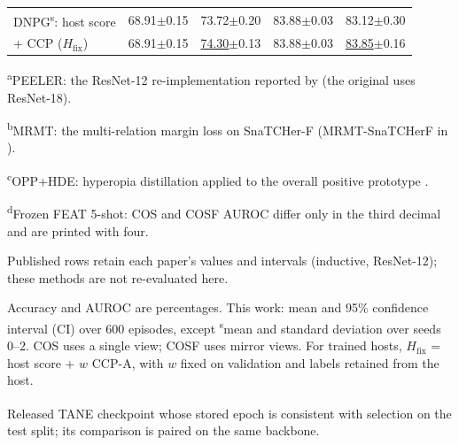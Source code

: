 \begin{table}[tbp]
\begin{tabular}{lcccc}
DNPG\textsuperscript{s}: host score & 68.91{\scriptsize$\pm$0.15} & 73.72{\scriptsize$\pm$0.20} & 83.88{\scriptsize$\pm$0.03} & 83.12{\scriptsize$\pm$0.30} \\
\quad + CCP ($H_{\mathrm{fix}}$) & 68.91{\scriptsize$\pm$0.15} & \underline{74.30}{\scriptsize$\pm$0.13} & 83.88{\scriptsize$\pm$0.03} & \underline{83.85}{\scriptsize$\pm$0.16} \\
\bottomrule
\end{tabular}
\par\smallskip
\begin{minipage}{\linewidth}\scriptsize
\textsuperscript{a}PEELER: the ResNet-12 re-implementation reported by \cite{jeong2021snatcher} (the original uses ResNet-18).\par
\textsuperscript{b}MRMT: the multi-relation margin loss on SnaTCHer-F (MRMT-SnaTCHerF in \cite{che2023mrm}).\par
\textsuperscript{c}OPP+HDE: hyperopia distillation \cite{geng2025hde} applied to the overall positive prototype \cite{sun2024opp}.\par
\textsuperscript{d}Frozen FEAT 5-shot: COS and COSF AUROC differ only in the third decimal and are printed with four.\par
Published rows retain each paper's values and intervals (inductive, ResNet-12); these methods are not re-evaluated here.\par
Accuracy and AUROC are percentages. This work: mean and 95\% confidence interval (CI) over 600 episodes, except \textsuperscript{s}mean and standard deviation over seeds 0--2. COS uses a single view; COSF uses mirror views. For trained hosts, $H_{\mathrm{fix}}$ = host score + $w$ CCP-A, with $w$ fixed on validation and labels retained from the host.\par
\textsuperscript{\dag}Released TANE checkpoint whose stored epoch is consistent with selection on the test split; its comparison is paired on the same backbone.\par
\end{minipage}
\end{table}
